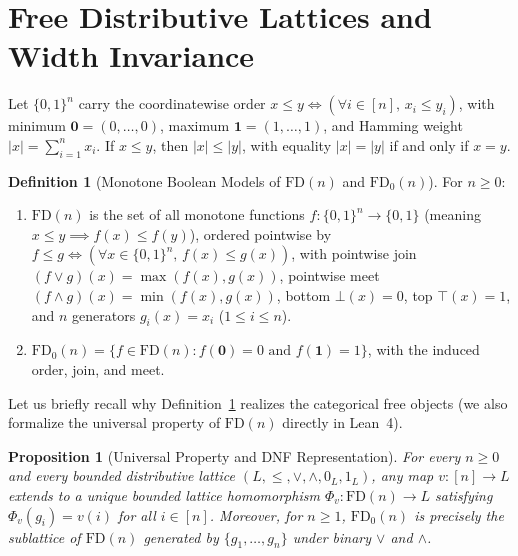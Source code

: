\documentclass[11pt]{article}
\newtheorem{proposition}[theorem]{Proposition}
\theoremstyle{definition}
\newtheorem{definition}[theorem]{Definition}
\newcommand{\FD}{\mathrm{FD}}
\newcommand{\FDz}{\mathrm{FD}_0}
\begin{document}
\section{Free Distributive Lattices and Width Invariance}

Let $\{0,1\}^n$ carry the coordinatewise order $x \le y \iff (\forall i \in [n],\, x_i \le y_i)$, with minimum $\mathbf{0} = (0,\dots,0)$, maximum $\mathbf{1} = (1,\dots,1)$, and Hamming weight $|x| = \sum_{i=1}^n x_i$. If $x \le y$, then $|x| \le |y|$, with equality $|x| = |y|$ if and only if $x = y$.

\begin{definition}[Monotone Boolean Models of $\FD(n)$ and $\FDz(n)$]\label{def:fd}
For $n \ge 0$:
\begin{enumerate}
  \item $\FD(n)$ is the set of all monotone functions $f : \{0,1\}^n \to \{0,1\}$ (meaning $x \le y \implies f(x) \le f(y)$), ordered pointwise by $f \le g \iff (\forall x \in \{0,1\}^n,\, f(x) \le g(x))$, with pointwise join $(f \vee g)(x) = \max(f(x), g(x))$, pointwise meet $(f \wedge g)(x) = \min(f(x), g(x))$, bottom $\bot(x) = 0$, top $\top(x) = 1$, and $n$ generators $g_i(x) = x_i$ ($1 \le i \le n$).
  \item $\FDz(n) = \{f \in \FD(n) : f(\mathbf{0}) = 0 \text{ and } f(\mathbf{1}) = 1\}$, with the induced order, join, and meet.
\end{enumerate}
\end{definition}

Let us briefly recall why Definition~\ref{def:fd} realizes the categorical free objects (we also formalize the universal property of $\FD(n)$ directly in Lean~4).

\begin{proposition}[Universal Property and DNF Representation]\label{prop:universal}
For every $n \ge 0$ and every bounded distributive lattice $(L, \le, \vee, \wedge, 0_L, 1_L)$, any map $v : [n] \to L$ extends to a unique bounded lattice homomorphism $\Phi_v : \FD(n) \to L$ satisfying $\Phi_v(g_i) = v(i)$ for all $i \in [n]$. Moreover, for $n \ge 1$, $\FDz(n)$ is precisely the sublattice of $\FD(n)$ generated by $\{g_1, \dots, g_n\}$ under binary $\vee$ and $\wedge$.
\end{proposition}
\end{document}
